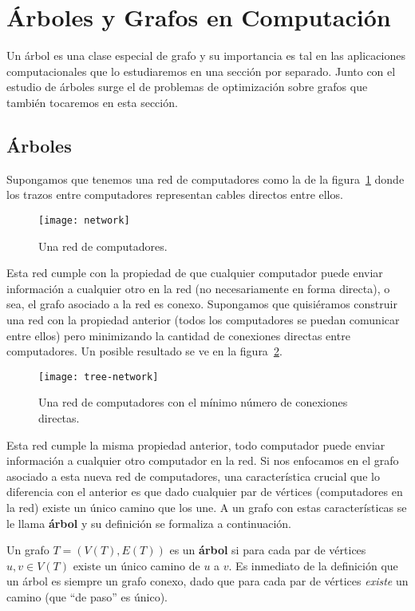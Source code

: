 \section{Árboles y Grafos en Computación}

Un árbol es una clase especial de grafo y su importancia es tal en las aplicaciones computacionales que lo estudiaremos en una sección por separado.
Junto con el estudio de árboles surge el de problemas de optimización sobre grafos que también tocaremos en esta sección.

\subsection{Árboles}

Supongamos que tenemos una red de computadores como la de la figura~\ref{fig:network} donde los trazos entre computadores representan cables directos entre ellos.
\begin{figure}[h!]
\centering
\texttt{[image: network]}
\caption{Una red de computadores.}
\label{fig:network}
\end{figure}
Esta red cumple con la propiedad de que cualquier computador puede enviar información a cualquier otro en la red (no necesariamente en forma directa), o sea, el grafo asociado a la red es conexo.
Supongamos que quisiéramos construir una red con la propiedad anterior (todos los computadores se puedan comunicar entre ellos) pero minimizando la cantidad de conexiones directas entre computadores.
Un posible resultado se ve en la figura~\ref{fig:tree-network}.
\begin{figure}[h!]
\centering
\texttt{[image: tree-network]}
\caption{Una red de computadores con el mínimo número de conexiones directas.}
\label{fig:tree-network}
\end{figure}
Esta red cumple la misma propiedad anterior, todo computador puede enviar información a cualquier otro computador en la red.
Si nos enfocamos en el grafo asociado a esta nueva red de computadores, una característica crucial que lo diferencia con el anterior es que dado cualquier par de vértices (computadores en la red) existe un único camino que los une.
A un grafo con estas características se le llama {\bf árbol} y su definición se formaliza a continuación.

\begin{definicion}
Un grafo $T=(V(T),E(T))$ es un {\bf árbol} si para cada par de vértices $u,v\in V(T)$ existe un único camino de $u$ a $v$.
Es inmediato de la definición que un árbol es siempre un grafo conexo, dado que para cada par de vértices \emph{existe} un camino (que ``de paso'' es único).
\end{definicion}

